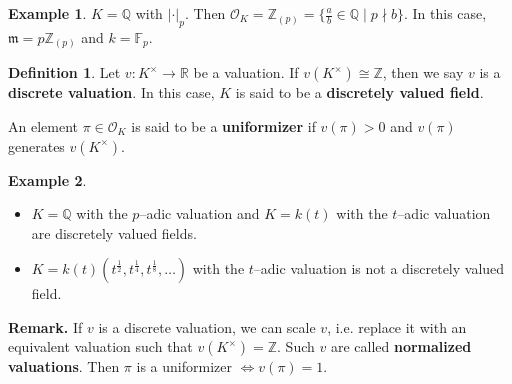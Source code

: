 \documentclass{article}
\theoremstyle{definition}
\newtheorem{example}{Example}[section]
\newtheorem{defn}{Definition}[section]
\begin{document}
\begin{example}
    $K=\mathbb{Q}$ with $|\cdot|_p$. Then $\mathcal{O}_K = \mathbb{Z}_{(p)} = \{\frac{a}{b} \in \mathbb{Q} \mid p \nmid b\}$. In this case, $\mathfrak{m} = p\mathbb{Z}_{(p)}$ and $k = \mathbb{F}_p$.
\end{example}

\begin{defn}
    Let $v:K^{\times} \to \mathbb{R}$ be a valuation. If $v(K^{\times}) \cong \mathbb{Z}$, then we say $v$ is a \textbf{discrete valuation}. In this case, $K$ is said to be a \textbf{discretely valued field}. 
    \vspace{1mm}
     
    An element $\pi \in \mathcal{O}_K$ is said to be a \textbf{uniformizer} if $v(\pi)>0$ and $v(\pi)$ generates $v(K^\times)$.
\end{defn}
\begin{example}
    \begin{itemize}
        \item $K=\mathbb{Q}$ with the $p$--adic valuation and $K=k(t)$ with the $t$--adic valuation are discretely valued fields.
        \item $K=k(t)(t^{\frac{1}{2}}, t^{\frac{1}{4}}, t^{\frac{1}{8}},\ldots)$ with the $t$--adic valuation is not a discretely valued field.
    \end{itemize}
\end{example}
\textbf{Remark.} If $v$ is a discrete valuation, we can scale $v$, i.e. replace it with an equivalent valuation such that $v(K^\times) = \mathbb{Z}$. Such $v$ are called \textbf{normalized valuations}. Then $\pi$ is a uniformizer $\iff v(\pi) = 1$.
\end{document}
